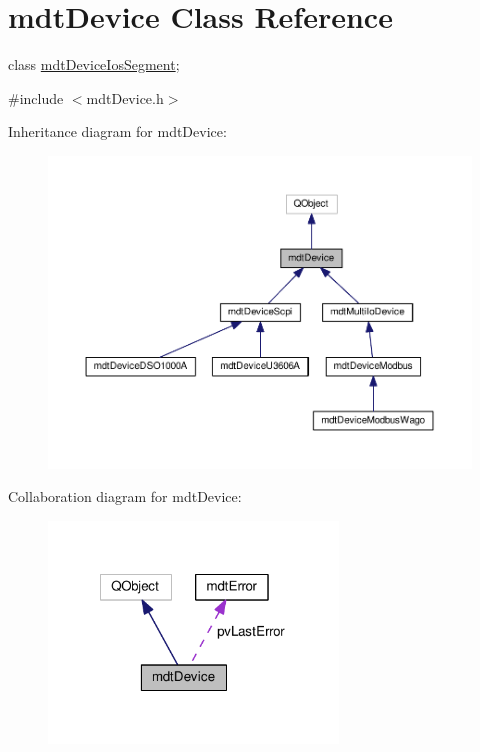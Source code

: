 \hypertarget{classmdt_device}{\section{mdt\-Device Class Reference}
\label{classmdt_device}
}


class \hyperlink{classmdt_device_ios_segment}{mdt\-Device\-Ios\-Segment};  




{\ttfamily \#include $<$mdt\-Device.\-h$>$}



Inheritance diagram for mdt\-Device\-:
\nopagebreak
\begin{figure}[H]
\begin{center}
\leavevmode
\includegraphics[width=350pt]{classmdt_device__inherit__graph}
\end{center}
\end{figure}


Collaboration diagram for mdt\-Device\-:
\nopagebreak
\begin{figure}[H]
\begin{center}
\leavevmode
\includegraphics[width=218pt]{classmdt_device__coll__graph}
\end{center}
\end{figure}
